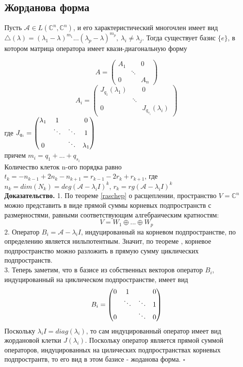 \subsection{Жорданова форма}
\begin{theor}
Пусть $\mathcal A\in L(\mathbb C^n,\mathbb C^n)$, и его характеристический
многочлен имеет вид $\triangle(\lambda)=(\lambda_1-\lambda)^{m_1}..
.(\lambda_p-\lambda)^{m_p},~\lambda_i\ne\lambda_j$. Тогда существует базис
$\{e\}$, в котором матрица оператора имеет квази-диагональную форму
\end{theor}
$$A=\begin{pmatrix}\boxed{A_1}&&0\\&\ddots&\\0&&\boxed{A_n}\end{pmatrix}$$
$$A_i=\begin{pmatrix}\boxed{J_{q_1}(\lambda_1)}&&0\\&\ddots&\\0&&\boxed
{J_{q_{s_i}}(\lambda_i)}\end{pmatrix}$$
где $J_{q_i}=\begin{pmatrix}\lambda_1&1&&\large{0}\\&\ddots&\ddots&1\\\large
{0}&&\ddots&\lambda_1\end{pmatrix}$\\
причем $m_i=q_1+...+q_{s_i}$\\
Количество клеток n-ого порядка равно $t_k=-n_{k-1}+2n_k-n_{k+1}=r_{k-1}-2r_
k+r_{k+1}$, где
$n_k=dim(N_k)=deg(\mathcal A-\lambda_iI)^k$, $r_k=rg(\mathcal A-\lambda_iI)^k$\\
\textbf{Доказательство.} 
1. По теореме \ref{raschep} о расщеплении, пространство $V=\mathbb C^n$ можно 
представить в виде прямой суммы корневых подпространств с размерностями, 
равными соответствующим алгебраическим кратностям:
$$V=W_1\oplus...\oplus W_p$$
2. Оператор $B_i=\mathcal A-\lambda_iI$, индуцированный на корневом 
подпространстве, по определению является нильпотентным. Значит, по теореме ,
корневое подпространство можно разложить в прямую сумму циклических подпространств.\\
3. Теперь заметим, что в базисе из собственных векторов оператор $B_i$, 
индуцированный на циклическом подпространстве, имеет вид 
$$B_i=\begin{pmatrix}0&1&&\large{0}\\&\ddots&\ddots&1\\\large{0}&&\ddots&0
\end{pmatrix}$$
Поскольку $\lambda_iI=diag(\lambda_i)$, то сам индуцированный оператор имеет
вид жордановой клетки $J(\lambda_i)$. Поскольку оператор является прямой суммой
операторов, индуцированных на цилических подпространствах корневых 
подпространтв, то его вид в этом базисе - жоданова форма. $\square$


